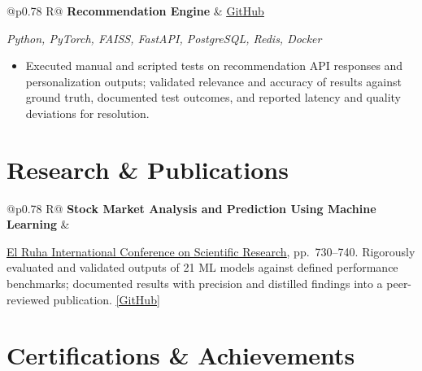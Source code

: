 \documentclass[a4paper,10pt]{article}
\newcommand{\ulink}[2]{\href{#1}{\uline{#2}}}
\newcommand{\subheading}[1]{{\color[HTML]{0A0A0A}\fontsize{12}{14}\selectfont\bfseries #1}}
\newcommand{\techstack}[1]{{\color[HTML]{5C5C5C}\fontsize{10.5}{12.5}\selectfont\itshape #1}}
\newcommand{\meta}[1]{{\color[HTML]{5C5C5C}\fontsize{10.5}{12.5}\selectfont #1}}
\begin{document}
\begin{tabularx}{\linewidth}{@{}p{0.78\linewidth} R@{}}
\subheading{Recommendation Engine} & \meta{\ulink{https://github.com/su-jin1425/Recommendation-Engine}{GitHub}}
\end{tabularx}
\vspace{1pt}
\techstack{Python, PyTorch, FAISS, FastAPI, PostgreSQL, Redis, Docker}
\begin{itemize}[nosep, leftmargin=1.5em, itemsep=1pt, topsep=2pt]
\item {\color[HTML]{0A0A0A}\fontsize{11}{14}\selectfont
Executed manual and scripted tests on recommendation API responses and personalization outputs; validated relevance and accuracy of results against ground truth, documented test outcomes, and reported latency and quality deviations for resolution.}
\end{itemize}

\vspace{2pt}

\section{Research \& Publications}
\vspace{2pt}

\begin{tabularx}{\linewidth}{@{}p{0.78\linewidth} R@{}}
\subheading{Stock Market Analysis and Prediction Using Machine Learning} & \meta{2025}
\end{tabularx}
\vspace{1pt}
{\color[HTML]{0A0A0A}\fontsize{11}{14}\selectfont
\ulink{https://www.elruha.org/_files/ugd/614b1f_6b95e1b697bf452b9907ba46e0151c05.pdf\#page=774}{El Ruha International Conference on Scientific Research}, pp.\ 730--740. Rigorously evaluated and validated outputs of 21 ML models against defined performance benchmarks; documented results with precision and distilled findings into a peer-reviewed publication. \ulink{https://github.com/su-jin1425/Set-Project}{[GitHub]}}

\vspace{2pt}

\section{Certifications \& Achievements}
\vspace{2pt}
\end{document}
